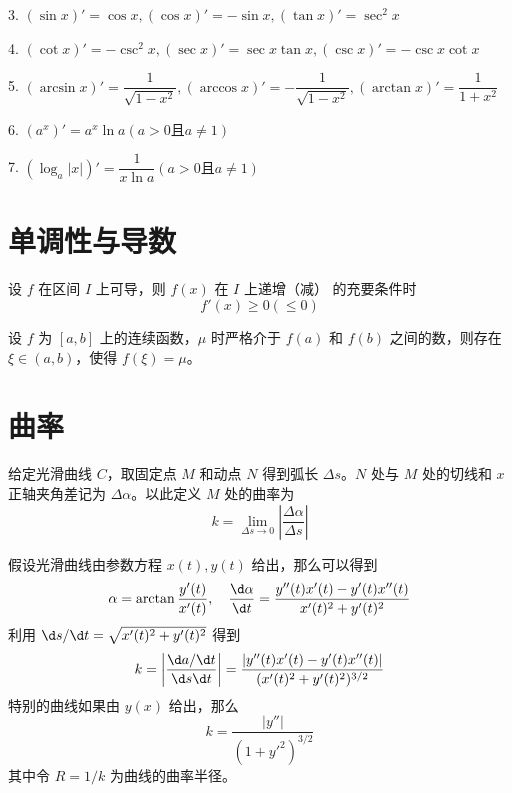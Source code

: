 3. $(\sin x)' = \cos x,(\cos x)'=-\sin x,(\tan x)'=\sec^2x$

4. $(\cot x)' = -\csc^2 x,(\sec x)'=\sec x \tan x,(\csc x)'=-\csc x \cot x$

5. $(\arcsin x)'=\dfrac{1}{\sqrt{1-x^2}},(\arccos x)' = -\dfrac{1}{\sqrt{1-x^2}},(\arctan x)'=\dfrac{1}{1+x^2}$

6. $(a^x)'=a^x \ln a(a>0\text{且}a\ne 1)$

7. $(\log_a|x|)'=\dfrac{1}{x\ln a}(a>0\text{且}a\ne 1)$

\section{单调性与导数}

\begin{theorem}
	设 $f$ 在区间 $I$ 上可导，则 $f(x)$ 在 $I$ 上递增（减） 的充要条件时
	$$f'(x) \geqslant 0(\leqslant 0)$$
\end{theorem}

\begin{theorem}[介值定理]
	设 $f$ 为 $[a,b]$ 上的连续函数，$\mu$ 时严格介于 $f(a)$ 和 $f(b)$ 之间的数，则存在 $\xi\in (a,b)$，使得 $f(\xi)=\mu$。
\end{theorem}

\section{曲率}

给定光滑曲线 $C$，取固定点 $M$ 和动点 $N$ 得到弧长 $\Delta s$。$N$ 处与 $M$ 处的切线和 $x$ 正轴夹角差记为 $\Delta \alpha$。以此定义 $M$ 处的曲率为
\[ k = \lim_{\Delta s \to 0} \left| \frac{\Delta \alpha}{\Delta s} \right| \]

假设光滑曲线由参数方程 $x(t), y(t)$ 给出，那么可以得到
\[ \alpha = \arctan \frac{y'(t)}{x'(t)}, \quad \frac{\d \alpha}{\d t} = \frac{y''(t)x'(t) - y'(t) x''(t)}{x'(t)^2 + y'(t)^2} \]
利用 $\d s/ \d t = \sqrt{x'(t)^2 + y'(t)^2}$ 得到
\[ k = \left| \frac{\d a / \d t}{\d s \d t} \right| = \frac{|y''(t)x'(t) - y'(t) x''(t)|}{(x'(t)^2 + y'(t)^2)^{3/2}} \]
特别的曲线如果由 $y(x)$ 给出，那么
\[ k = \frac{|y''|}{(1+y'^2)^{3/2}} \]
其中令 $R = 1/k$ 为曲线的曲率半径。

